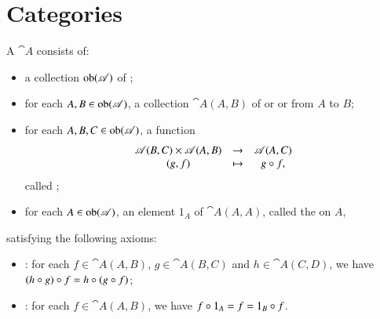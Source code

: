 \section{Categories}
\label{sec:cats}


\begin{defn}
A %
%
%
$\cat{A}$ consists of:
%
\begin{itemize}
\item
a collection $\operatorname{ob}(\mathscr{A})$%
%
%
of ;%
%
%

\item
for each $A, B \in \operatorname{ob}(\mathscr{A})$, a collection $\cat{A}(A, B)$%
%
%
of %
%
%
or %
%
%
or %
%
%
from $A$ to $B$;

\item
for each $A, B, C \in \operatorname{ob}(\mathscr{A})$, a function
\[
\begin{array}{ccc}
\cat{A}(B, C) \times \cat{A}(A, B) &
\to	&
\cat{A}(A, C)	\\
(g, f)	&
\mapsto	&
g \of f,%
%
\ntn{of}
%
\end{array}
\]
called ;%
%
%

\item
for each $A \in \operatorname{ob}(\mathscr{A})$, an element $1_A$%
%
%
of $\cat{A}(A, A)$, called the %
%
%
on $A$,
\end{itemize}
%
satisfying the following axioms:
%
\begin{itemize}
\item
{}:%
%
%
for each $f \in \cat{A}(A, B)$, $g \in \cat{A}(B, C)$ and $h \in \cat{A}(C,
D)$, we have $(h \mathbin{\circ} g) \mathbin{\circ} f = h \mathbin{\circ} (g \mathbin{\circ} f)$;

\item
{}: for each $f \in \cat{A}(A, B)$, we have $f \mathbin{\circ} 1_A = f = 1_B \mathbin{\circ} f$.
\end{itemize}
\end{defn}


